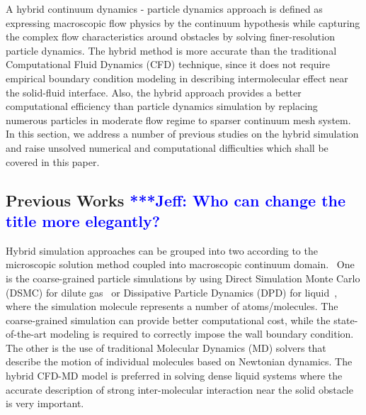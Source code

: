 \documentclass[preprint,12pt]{elsarticle}
\newcommand{\skonote}[1]{ {\textcolor{blue} { ***Jeff: #1 }}}
\newcommand{\skonote}[1]{}
\begin{document}
A hybrid continuum dynamics - particle dynamics approach is defined as expressing macroscopic flow physics by the continuum hypothesis while capturing the complex flow characteristics around obstacles by solving finer-resolution particle dynamics. The hybrid method is more accurate than the traditional Computational Fluid Dynamics (CFD) technique, since it does not require empirical boundary condition modeling in describing intermolecular effect near the solid-fluid interface. Also, the hybrid approach provides a better computational efficiency than particle dynamics simulation
by replacing numerous particles in moderate flow regime to sparser continuum mesh system. 
In this section, we address a number of previous studies on the hybrid simulation and raise unsolved numerical and computational difficulties which shall be covered in this paper.


\subsection{Previous Works \skonote{Who can change the title more elegantly?}}
Hybrid simulation approaches can be grouped into two according to the microscopic solution method coupled into macroscopic continuum domain.~\cite{Koumoutsakos} One is the coarse-grained particle simulations by using Direct Simulation Monte Carlo (DSMC) for dilute gas~\cite{Garcia,Sun} or Dissipative Particle Dynamics (DPD) for liquid~\cite{Fedosov1,Fedosov2}, where the simulation molecule represents a number of atoms/molecules. The coarse-grained simulation can provide better computational cost, while the state-of-the-art modeling is required to correctly impose the wall boundary condition. The other is the use of traditional Molecular Dynamics (MD) solvers that describe the motion of individual molecules based on Newtonian dynamics. The hybrid CFD-MD model is preferred in solving dense liquid systems where the accurate description of strong inter-molecular interaction near the solid obstacle is very important.
\end{document}

